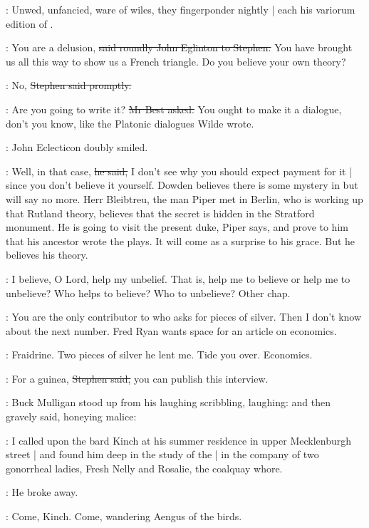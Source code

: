 \StephenInt:
Unwed,
unfancied,
ware of wiles,
they fingerponder nightly |
each his variorum edition of .

\eglinton:
You are a delusion,
\sout{said roundly John Eglinton to Stephen.}
You have brought us all this way to show us a French triangle.
Do you believe your own theory?

\Stephen:
No,
\sout{Stephen said promptly.}

\best:
Are you going to write it?
\sout{Mr Best asked.}
You ought to make it a dialogue,
don't you know,
like the Platonic dialogues Wilde wrote.

:
John Eclecticon doubly smiled.

\eglinton:
Well,
in that case,
\sout{he said,}
I don't see why you should expect payment for it |
since you don't believe it yourself.
Dowden believes there is some mystery in  but will say no more.
Herr Bleibtreu,
the man Piper met in Berlin,
who is working up that Rutland theory,
believes that the secret is hidden in the Stratford monument.
He is going to visit the present duke,
Piper says,
and prove to him that his ancestor wrote the plays.
It will come as a surprise to his grace.
But he believes his theory.

\StephenInt:
I believe,
O Lord, help my unbelief.
That is, help me to believe or help me to unbelieve?
Who helps to believe?
Who to unbelieve?
Other chap.%

\eglinton:
You are the only contributor to  who asks for pieces of silver.
Then I don't know about the next number.
Fred Ryan wants space for an article on economics.

\StephenInt:
Fraidrine.
Two pieces of silver he lent me.
Tide you over.
Economics.

\Stephen:
For a guinea,
\sout{Stephen said,}
you can publish this interview.

:
Buck Mulligan stood up from his laughing scribbling,
laughing:
and then gravely said,
honeying malice:

\mulligan:
I called upon the bard Kinch at his summer residence in upper Mecklenburgh street |
and found him deep in the study of the  |
in the company of two gonorrheal ladies,
Fresh Nelly and Rosalie,
the coalquay whore.

:
He broke away.

\mulligan:
Come, Kinch.
Come, wandering Aengus of the birds.

